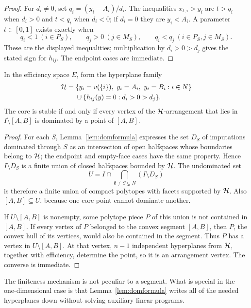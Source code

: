 \begin{proof}
For $d_i\ne0$, set $q_i=(y_i-A_i)/d_i$. The inequalities
$x_{t,i}>y_i$ are $t>q_i$ when $d_i>0$ and $t<q_i$ when $d_i<0$; if
$d_i=0$ they are $y_i<A_i$. A parameter $t\in[0,1]$ exists exactly when
\[
 q_i<1\ (i\in P_S),\qquad q_j>0\ (j\in M_S),\qquad
 q_i<q_j\ (i\in P_S,j\in M_S).
\]
These are the displayed inequalities; multiplication by
$d_i>0>d_j$ gives the stated sign for $h_{ij}$. The endpoint cases are
immediate.
\end{proof}

\begin{proposition}\label{prop:arrangement}
In the efficiency space $E$, form the hyperplane family
\[
\begin{split}
 {\cal H}={}&
 \{y_i=v(\{i\}),\ y_i=A_i,\ y_i=B_i:i\in N\}\\
 &{}\cup
 \{h_{ij}(y)=0:d_i>0>d_j\}.
\end{split}
\]
The core is stable if and only if every vertex of the ${\cal H}$-arrangement
that lies in $I\setminus[A,B]$ is dominated by a point of $[A,B]$.
\end{proposition}

\begin{proof}
For each $S$, Lemma~\ref{lem:domformula} expresses the set $D_S$ of
imputations dominated through $S$ as an intersection of open halfspaces whose
boundaries belong to ${\cal H}$; the endpoint and empty-face cases have the
same property. Hence $I\setminus D_S$ is a finite union of closed halfspaces
bounded by ${\cal H}$. The undominated set
\[
 U=I\cap\bigcap_{\emptyset\ne S\subsetneq N}(I\setminus D_S)
\]
is therefore a finite union of compact polytopes with facets supported by
${\cal H}$. Also $[A,B]\subseteq U$, because one core point cannot dominate
another.

If $U\setminus[A,B]$ is nonempty, some polytope piece $P$ of this union is not
contained in $[A,B]$. If every vertex of $P$ belonged to the convex segment
$[A,B]$, then $P$, the convex hull of its vertices, would also be contained
in the segment. Thus $P$ has a vertex in $U\setminus[A,B]$. At that vertex,
$n-1$ independent hyperplanes from ${\cal H}$, together with efficiency,
determine the point, so it is an arrangement vertex. The converse is
immediate.
\end{proof}

The finiteness mechanism is not peculiar to a segment.  What is special in
the one-dimensional case is that Lemma~\ref{lem:domformula} writes all of the
needed hyperplanes down without solving auxiliary linear programs.

